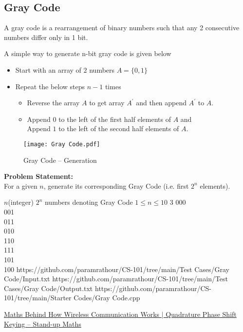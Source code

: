 \documentclass[../../Problems]{subfiles}
\begin{document}
\subsection{Gray Code}
A gray code is a rearrangement of binary numbers such that any 2 consecutive numbers differ only in 1 bit.

A simple way to generate n-bit gray code is given below
\begin{itemize}	
	\item Start with an array of $2$ numbers $A = \{0, 1\}$
	\item Repeat the below steps $n-1$ times
	\begin{itemize}
		\item Reverse the array $A$ to get array $A^\prime$  and then append $A^\prime$  to $A$.
		\item Append $0$ to the left of the first half elements of $A$ and\\
		Append $1$ to the left of the second half elements of $A$.
	\end{itemize}
\end{itemize}
\begin{figure}[H]
	\centering
	\texttt{[image: Gray Code.pdf]}
	\caption{Gray Code -- Generation}
\end{figure}
\vspace{-2em}
\textbf{Problem Statement:}\\
For a given $n$, generate its corresponding Gray Code (i.e. first $2^n$ elements).
\begin{testcasesMore}
	{$n$\hfill(integer)}
	{$2^n$ numbers denoting Gray Code}
	{$1 \leq n \leq 10$}
	{3}
	{000\\001\\011\\010\\110\\111\\101\\100}
	{https://github.com/paramrathour/CS-101/tree/main/Test Cases/Gray Code/Input.txt}
	{https://github.com/paramrathour/CS-101/tree/main/Test Cases/Gray Code/Output.txt}
	{https://github.com/paramrathour/CS-101/tree/main/Starter Codes/Gray Code.cpp}
\end{testcasesMore}
\begin{funvideo}
\href{https://youtu.be/To7Ll5AGboI}{Maths Behind How Wireless Communication Works $\mid$ Quadrature Phase Shift Keying -- Stand-up Maths}
\end{funvideo}
\end{document}

